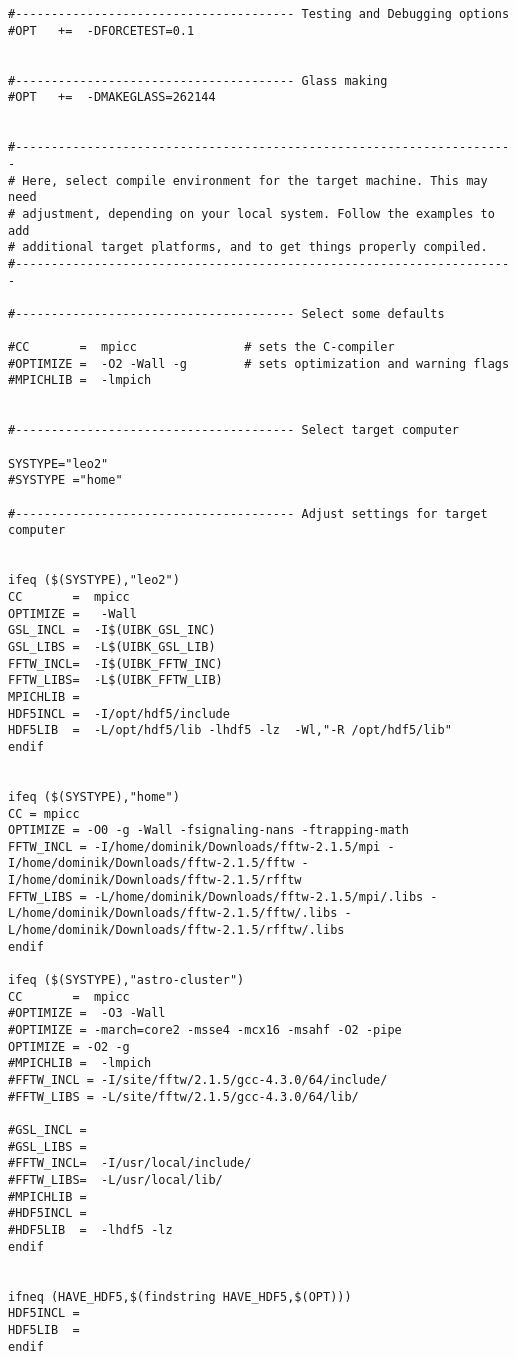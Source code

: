 \documentclass[a4paper,english,10.5pt]{scrartcl}
\begin{document}
\begin{verbatim}
#--------------------------------------- Testing and Debugging options
#OPT   +=  -DFORCETEST=0.1


#--------------------------------------- Glass making
#OPT   +=  -DMAKEGLASS=262144


#----------------------------------------------------------------------
# Here, select compile environment for the target machine. This may need 
# adjustment, depending on your local system. Follow the examples to add
# additional target platforms, and to get things properly compiled.
#----------------------------------------------------------------------

#--------------------------------------- Select some defaults

#CC       =  mpicc               # sets the C-compiler
#OPTIMIZE =  -O2 -Wall -g        # sets optimization and warning flags
#MPICHLIB =  -lmpich


#--------------------------------------- Select target computer

SYSTYPE="leo2"
#SYSTYPE ="home"

#--------------------------------------- Adjust settings for target computer


ifeq ($(SYSTYPE),"leo2")
CC       =  mpicc   
OPTIMIZE =   -Wall 
GSL_INCL =  -I$(UIBK_GSL_INC)
GSL_LIBS =  -L$(UIBK_GSL_LIB) 
FFTW_INCL=  -I$(UIBK_FFTW_INC)
FFTW_LIBS=  -L$(UIBK_FFTW_LIB)
MPICHLIB =   
HDF5INCL =  -I/opt/hdf5/include
HDF5LIB  =  -L/opt/hdf5/lib -lhdf5 -lz  -Wl,"-R /opt/hdf5/lib"
endif


ifeq ($(SYSTYPE),"home")
CC = mpicc
OPTIMIZE = -O0 -g -Wall -fsignaling-nans -ftrapping-math
FFTW_INCL = -I/home/dominik/Downloads/fftw-2.1.5/mpi -I/home/dominik/Downloads/fftw-2.1.5/fftw -I/home/dominik/Downloads/fftw-2.1.5/rfftw
FFTW_LIBS = -L/home/dominik/Downloads/fftw-2.1.5/mpi/.libs -L/home/dominik/Downloads/fftw-2.1.5/fftw/.libs -L/home/dominik/Downloads/fftw-2.1.5/rfftw/.libs
endif

ifeq ($(SYSTYPE),"astro-cluster")
CC       =  mpicc   
#OPTIMIZE =  -O3 -Wall
#OPTIMIZE = -march=core2 -msse4 -mcx16 -msahf -O2 -pipe
OPTIMIZE = -O2 -g
#MPICHLIB =  -lmpich
#FFTW_INCL = -I/site/fftw/2.1.5/gcc-4.3.0/64/include/
#FFTW_LIBS = -L/site/fftw/2.1.5/gcc-4.3.0/64/lib/

#GSL_INCL =
#GSL_LIBS =
#FFTW_INCL=  -I/usr/local/include/
#FFTW_LIBS=  -L/usr/local/lib/
#MPICHLIB =
#HDF5INCL =  
#HDF5LIB  =  -lhdf5 -lz 
endif


ifneq (HAVE_HDF5,$(findstring HAVE_HDF5,$(OPT))) 
HDF5INCL =
HDF5LIB  =
endif



\end{verbatim}
\end{document}
